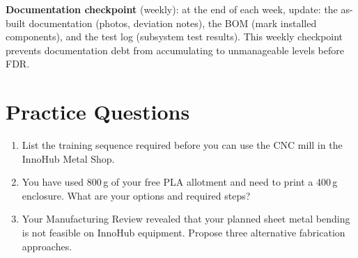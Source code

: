 \textbf{Documentation checkpoint} (weekly): at the end of each week, update: the as-built documentation (photos, deviation notes), the BOM (mark installed components), and the test log (subsystem test results). This weekly checkpoint prevents documentation debt from accumulating to unmanageable levels before FDR.


\section{Practice Questions}
\begin{enumerate}[leftmargin=1.5em]
\item List the training sequence required before you can use the CNC mill in the InnoHub Metal Shop.
\item You have used 800\,g of your free PLA allotment and need to print a 400\,g enclosure. What are your options and required steps?
\item Your Manufacturing Review revealed that your planned sheet metal bending is not feasible on InnoHub equipment. Propose three alternative fabrication approaches.
\end{enumerate}


